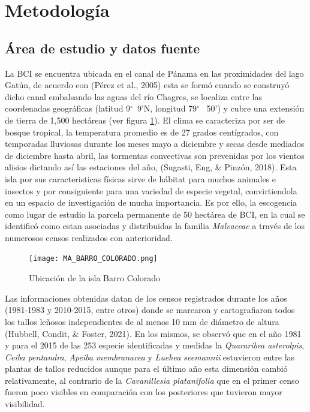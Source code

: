 \documentclass[11pt,]{article}
\begin{document}
\section{Metodología}\label{metodologuxeda}

\subsection{Área de estudio y datos
fuente}\label{uxe1rea-de-estudio-y-datos-fuente}

La BCI se encuentra ubicada en el canal de Pánama en las proximidades
del lago Gatún, de acuerdo con (Pérez et al., 2005) esta se formó cuando
se construyó dicho canal embalsando las aguas del río Chagres, se
localiza entre las coordenadas geográficas (latitud 9\(^\circ\)~9'N,
longitud 79\(^\circ\)~ 50') y cubre una extensión de tierra de 1,500
hectáreas (ver figura \ref{mapa}). El clima se caracteriza por ser de
bosque tropical, la temperatura promedio es de 27 grados centígrados,
con temporadas lluviosas durante los meses mayo a diciembre y secas
desde mediados de diciembre hasta abril, las tormentas convectivas son
prevenidas por los vientos alisios dictando así las estaciones del año,
(Sugasti, Eng, \& Pinzón, 2018). Esta isla por sus caracteristicas
físicas sirve de hábitat para muchos animales e insectos y por
consiguiente para una variedad de especie vegetal, convirtiendola en un
espacio de investigación de mucha importancia. Es por ello, la
escogencia como lugar de estudio la parcela permanente de 50 hectárea de
BCI, en la cual se identificó como estan asociadas y distribuidas la
familia \emph{Malvaceae} a través de los numerosos censos realizados con
anterioridad.

\begin{figure}
\centering
\texttt{[image: MA\_BARRO\_COLORADO.png]}
\caption{Ubicación de la isla Barro Colorado\label{mapa}}
\end{figure}

Las informaciones obtenidas datan de los censos registrados durante los
años (1981-1983 y 2010-2015, entre otros) donde se marcaron y
cartografiaron todos los tallos leñosos independientes de al menos 10 mm
de diámetro de altura (Hubbell, Condit, \& Foster, 2021). En los mismos,
se observó que en el año 1981 y para el 2015 de las 253 especie
identificadas y medidas la \emph{Quararibea asterolpis}, \emph{Ceiba
pentandra}, \emph{Apeiba membranacea} y \emph{Luehea seemannii}
estuvieron entre las plantas de tallos reducidos aunque para el último
año esta dimensión cambió relativamente, al contrario de la
\emph{Cavanillesia platanifolia} que en el primer censo fueron poco
visibles en comparación con los posteriores que tuvieron mayor
visibilidad.
\end{document}
